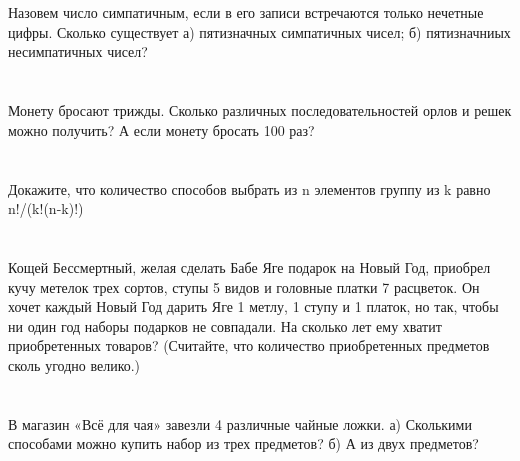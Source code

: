 \documentclass{article}%
\begin{document}
%
\section{}%
\label{sec:}%
Назовем число симпатичным, если в его записи встречаются только
нечетные цифры. Сколько существует а) пятизначных симпатичных чисел;
б) пятизначниых несимпатичных чисел?%
%
\iffalse%
Автор: 25 школа%
Дата: 01{-}11{-}2012%
Название: None%
Подсказка: \textbackslash{}\textbackslash{}%
nan%
\fi

%
\section{}%
\label{sec:}%
Монету бросают трижды. Сколько различных последовательностей орлов
и решек можно получить? А если монету бросать 100 раз?%
%
\iffalse%
Автор: 25 школа%
Дата: 01{-}11{-}2012%
Название: None%
Подсказка: \textbackslash{}\textbackslash{}%
nan%
\fi

%
\section{}%
\label{sec:}%
Докажите, что количество способов выбрать из n элементов  группу из k равно n!/(k!(n-k)!)%
%
\iffalse%
Автор: 25 школа%
Дата: 01{-}07{-}2017%
Название: None%
Подсказка: \textbackslash{}\textbackslash{}%
nan%
\fi

%
\section{}%
\label{sec:}%
Кощей Бессмертный, желая сделать Бабе Яге подарок на Новый Год,
приобрел кучу метелок трех сортов, ступы 5 видов и головные платки 7
расцветок. Он хочет каждый Новый Год дарить Яге 1 метлу, 1 ступу и 1
платок, но так, чтобы ни один год наборы подарков не совпадали. На
сколько лет ему хватит приобретенных товаров? (Считайте, что
количество приобретенных предметов сколь угодно велико.)%
%
\iffalse%
Автор: 25 школа%
Дата: 01{-}11{-}2012%
Название: None%
Подсказка: \textbackslash{}\textbackslash{}%
nan%
\fi

%
\section{}%
\label{sec:}%
В магазин «Всё для чая» завезли 4 различные чайные ложки.
а) Сколькими способами можно купить набор из трех предметов?
б) А из двух предметов?%
%
\iffalse%
Автор: Ираклий Гагуа%
Дата: 07{-}01{-}2011%
Название: None%
Подсказка: \textbackslash{}\textbackslash{}%
nan%
\fi
\end{document}
